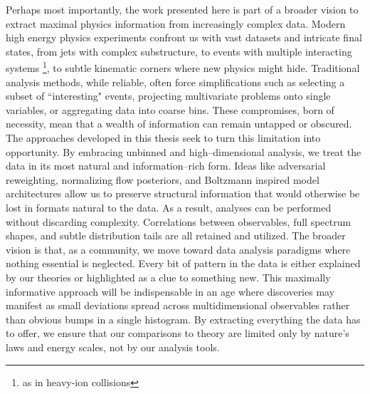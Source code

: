     Perhaps most importantly, the work presented here is part of a broader vision to extract {maximal physics information} from increasingly complex data.
    Modern high energy physics experiments confront us with vast datasets and intricate final states, from jets with complex substructure, to events with multiple interacting systems \footnote{as in heavy-ion collisions}, to subtle kinematic corners where new physics might hide.
    Traditional analysis methods, while reliable, often force simplifications such as selecting a subset of ``interesting" events, projecting multivariate problems onto single variables, or aggregating data into coarse bins.
    These compromises, born of necessity, mean that a wealth of information can remain untapped or obscured.
    The approaches developed in this thesis seek to turn this limitation into opportunity.
    By embracing unbinned and high--dimensional analysis, we treat the data in its most natural and information--rich form.
    Ideas like adversarial reweighting, normalizing flow posteriors, and Boltzmann inspired model architectures allow us to preserve structural information that would otherwise be lost in formats natural to the data.
    As a result, analyses can be performed without discarding complexity.
    Correlations between observables, full spectrum shapes, and subtle distribution tails are all retained and utilized.
    The broader vision is that, as a community, we move toward data analysis paradigms where nothing essential is neglected.
    Every bit of pattern in the data is either explained by our theories or highlighted as a clue to something new.
    This maximally informative approach will be indispensable in an age where discoveries may manifest as small deviations spread across multidimensional observables rather than obvious bumps in a single histogram.
    By extracting everything the data has to offer, we ensure that our comparisons to theory are limited only by nature's laws and energy scales, not by our analysis tools.
                
